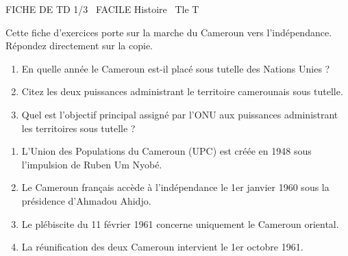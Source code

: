 \documentclass[11pt]{article}
\begin{document}
\begin{tcolorbox}[enhanced,colback=popink,colframe=popink,arc=10pt,boxrule=0pt,left=12pt,right=12pt,top=9pt,bottom=9pt]
{\color{white}\popxbold\small FICHE DE TD 1/3 \textbullet\ FACILE \hfill Histoire \textbullet\ Tle T\par}
\end{tcolorbox}
\vspace{4pt}
Cette fiche d'exercices porte sur la marche du Cameroun vers l'indépendance. Répondez directement sur la copie.

\begin{exercice}
\begin{enumerate}
    \item En quelle année le Cameroun est-il placé sous tutelle des Nations Unies ?
    \item Citez les deux puissances administrant le territoire camerounais sous tutelle.
    \item Quel est l'objectif principal assigné par l'ONU aux puissances administrant les territoires sous tutelle ?
\end{enumerate}
\end{exercice}

\begin{exercice}
\begin{enumerate}
    \item L'Union des Populations du Cameroun (UPC) est créée en 1948 sous l'impulsion de Ruben Um Nyobé.
    \item Le Cameroun français accède à l'indépendance le 1er janvier 1960 sous la présidence d'Ahmadou Ahidjo.
    \item Le plébiscite du 11 février 1961 concerne uniquement le Cameroun oriental.
    \item La réunification des deux Cameroun intervient le 1er octobre 1961.
\end{enumerate}
\end{exercice}
\end{document}
